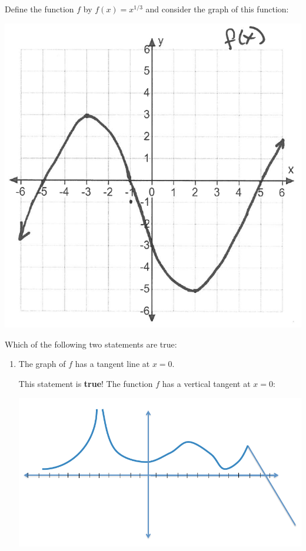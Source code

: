 \documentclass[nooutcomes]{ximera}
\begin{document}
	
\begin{problem}
  Define the function $f$ by $f(x) = x^{1/3}$ and consider the graph of this function:
  \begin{image}
    \includegraphics[scale = 0.5]{figure1.png}
  \end{image}

  Which of the following two statements are true:
  \begin{enumerate}
     \item The graph of $f$ has a tangent line at $x = 0$.
      \begin{freeResponse}
        This statement is \textbf{true}!
        The function $f$ has a vertical tangent at $x = 0$:
        \begin{image}
          \includegraphics[scale = 0.5]{figure4.png}
        \end{image}
      \end{freeResponse}


\end{enumerate}
\end{problem}
\end{document}
